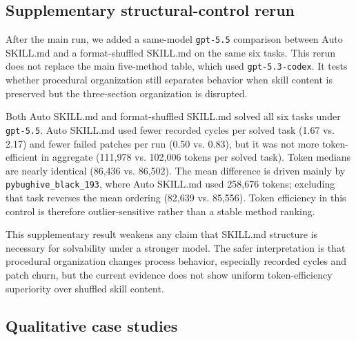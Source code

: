 \FloatBarrier
\subsection{Supplementary structural-control rerun}
\label{sec:results_structural_control}

After the main run, we added a same-model \texttt{gpt-5.5} comparison between Auto SKILL.md and a format-shuffled SKILL.md on the same six tasks. This rerun does not replace the main five-method table, which used \texttt{gpt-5.3-codex}. It tests whether procedural organization still separates behavior when skill content is preserved but the three-section organization is disrupted.

\FloatBarrier
\begin{table}[t]
\centering
\caption{Same-model \texttt{gpt-5.5} structural-control rerun on the first-six hard-smoke tasks. Both methods solve all tasks; Auto SKILL.md uses fewer recorded cycles and failed patches, while the shuffled control uses fewer tokens in aggregate.}
\label{tab:hard_first6_structural_control_gpt55}

\end{table}

Both Auto SKILL.md and format-shuffled SKILL.md solved all six tasks under \texttt{gpt-5.5}. Auto SKILL.md used fewer recorded cycles per solved task (1.67 vs. 2.17) and fewer failed patches per run (0.50 vs. 0.83), but it was not more token-efficient in aggregate (111,978 vs. 102,006 tokens per solved task). Token medians are nearly identical (86,436 vs. 86,502). The mean difference is driven mainly by \texttt{pybughive\_black\_193}, where Auto SKILL.md used 258,676 tokens; excluding that task reverses the mean ordering (82,639 vs. 85,556). Token efficiency in this control is therefore outlier-sensitive rather than a stable method ranking.

This supplementary result weakens any claim that SKILL.md structure is necessary for solvability under a stronger model. The safer interpretation is that procedural organization changes process behavior, especially recorded cycles and patch churn, but the current evidence does not show uniform token-efficiency superiority over shuffled skill content.

\FloatBarrier
\subsection{Qualitative case studies}
\label{sec:results_cases}

